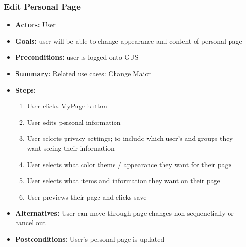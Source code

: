 \documentclass[12pt, oneside, letterpaper]{report}
\begin{document}
         \subsubsection{Edit Personal Page}
			\begin{itemize}
				\item{\textbf{Actors:} User}
				\item{\textbf{Goals:} user will be able to change appearance and content of personal page}
				\item{\textbf{Preconditions:} user is logged onto GUS}
				\item{\textbf{Summary:} Related use cases: Change Major}
				\item{\textbf{Steps:}
				\begin{enumerate}
					\item{User clicks MyPage button}
					\item{User edits personal information}
					\item{User selects privacy settings; to include which user's and groups they want seeing their information}
					\item{User selects what color theme / appearance they want for their page}
					\item{User selects what items and information they want on their page}
					\item{User previews their page and clicks save}
				\end{enumerate}
				}
				\item{\textbf{Alternatives:} User can move through page changes non-sequenctially or cancel out}
				\item{\textbf{Postconditions:} User's personal page is updated}
			\end{itemize}
\end{document}
